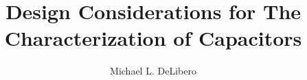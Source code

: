 \documentclass[ms,lof,lot]{metadata/cwru}
\title{Design Considerations for The Characterization of Capacitors}
\author{Michael L. DeLibero}
\begin{document}
\CWRUpreface{}
\CWRUack{}

\CWRUabstract{}

\CWRUpreamble{}











\end{document}
